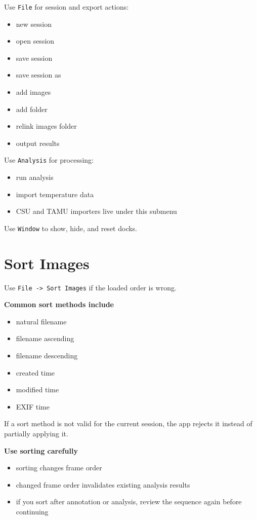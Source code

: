 \documentclass[
  9pt,
  letterpaper,
  oneside,
  open=any,
  DIV=15,
  parskip=half-,
  headings=big,
  numbers=noenddot
]{scrbook}
\newcommand{\manuallead}[1]{%
  \vspace{0.15em}%
  {\sffamily\bfseries\color{ManualBlue}#1}\par\nobreak\vspace{0.05em}%
}
\begin{document}
Use \texttt{File} for session and export actions:


\begin{itemize}[leftmargin=*,itemsep=0.35em,topsep=0.4em]
\item new session
\item open session
\item save session
\item save session as
\item add images
\item add folder
\item relink images folder
\item output results
\end{itemize}

Use \texttt{Analysis} for processing:


\begin{itemize}[leftmargin=*,itemsep=0.35em,topsep=0.4em]
\item run analysis
\item import temperature data
\item CSU and TAMU importers live under this submenu
\end{itemize}

Use \texttt{Window} to show, hide, and reset docks.


\section{Sort Images}

Use \texttt{File -> Sort Images} if the loaded order is wrong.


\manuallead{Common sort methods include}

\begin{itemize}[leftmargin=*,itemsep=0.35em,topsep=0.4em]
\item natural filename
\item filename ascending
\item filename descending
\item created time
\item modified time
\item EXIF time
\end{itemize}

If a sort method is not valid for the current session, the app rejects it instead of partially applying it.


\manuallead{Use sorting carefully}

\begin{itemize}[leftmargin=*,itemsep=0.35em,topsep=0.4em]
\item sorting changes frame order
\item changed frame order invalidates existing analysis results
\item if you sort after annotation or analysis, review the sequence again before continuing
\end{itemize}
\end{document}

